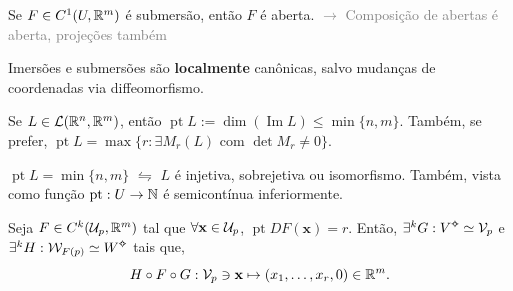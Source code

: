 \begin{tikzpicture}[scale= 0.9, >=to, shift={(0.75cm,4.65cm)}, baseline={(current bounding box.center)}, remember picture, overlay]
\end{tikzpicture}

\- \vspace{-1.4cm}
\begin{corollary}
    Se \(F\in C^1(U, \mathbb{R}^m)\) é submersão, então \(F\) é aberta. \textcolor{gray}{ \(\rightarrow \) Composição de abertas é aberta, projeções também }
\end{corollary}

\begin{note}
  Imersões e submersões são \textbf{localmente} canônicas, salvo mudanças de coordenadas via diffeomorfismo.
\end{note}

\newcommand{\pt}{\operatorname{pt}}
\begin{definition}
  Se \(L\in \mathcal{L}(\mathbb{R}^n, \mathbb{R}^m)\), então \(\pt L:= \dim( \operatorname{Im} L)\leq \min \{n,m\}\). Também, se prefer,  \( \pt L = \max\{ r: \exists M_r(L)\text{ com } \det M_r\neq 0\}\). 
\end{definition}

\begin{note}
  \(\pt L = \min\{n,m\}\) \(\leftrightharpoons\) \(L\) é injetiva, sobrejetiva ou isomorfismo. Também, vista como função \(\pt: U \to \N\) é semicontínua inferiormente.
\end{note}


\hypertarget{thmPC}{}
\begin{theorem}
    Seja \(F \in C^k(\mathcal{U}_p, \mathbb{R}^m)\) tal que \(\forall \textbf{x}\in \mathcal{U}_p\), \(\pt DF(\textbf{x}) = r\). Então, \(\exists  ^k G: V\ab \simeq \mathcal{V}_p\) e \(\exists ^k H : \mathcal{W}_{F(p)} \simeq W\ab\) tais que, 
    \[H\circ F \circ G : \mathcal{V}_p \ni \textbf{x} \mapsto (x_1, \ldots, x_r, 0) \in \mathbb{R}^m. \]   
\end{theorem}

